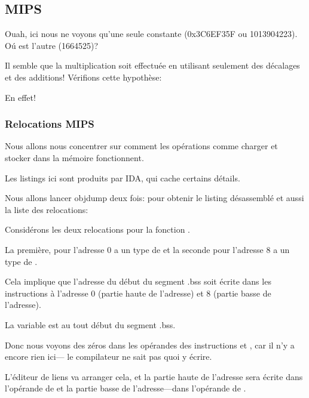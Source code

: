 \subsection{MIPS}



Ouah, ici nous ne voyons qu'une seule constante (0x3C6EF35F ou 1013904223).
Oú est l'autre (1664525)?

Il semble que la multiplication soit effectuée en utilisant seulement des décalages
et des additions!
Vérifions cette hypothèse:





En effet!

\subsubsection{Relocations MIPS}

Nous allons nous concentrer sur comment les opérations comme charger et stocker dans
la mémoire fonctionnent.

Les listings ici sont produits par IDA, qui cache certains détails.

Nous allons lancer objdump deux fois: pour obtenir le listing désassemblé et aussi
la liste des relocations:



Considérons les deux relocations pour la fonction .

La première, pour l'adresse 0 a un type de  et la seconde pour
l'adresse 8 a un type de .

Cela implique que l'adresse du début du segment .bss soit écrite dans les instructions
à l'adresse 0 (partie haute de l'adresse) et 8 (partie basse de l'adresse).

La variable  est au tout début du segment .bss.

Donc nous voyons des zéros dans les opérandes des instructions \LUI et \SW, car il
n'y a encore rien ici--- le compilateur ne sait pas quoi y écrire.

L'éditeur de liens va arranger cela, et la partie haute de l'adresse sera écrite
dans l'opérande de \LUI et la partie basse de l'adresse---dans l'opérande de \SW.

